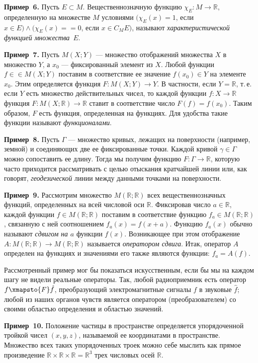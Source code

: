 \textbf{Пример~6.} Пусть $E \subset M$. Вещественнозначную функцию $\chi_E \colon M \to \mathbb{R}$,
определенную на множестве $M$ условиями $(\chi_E(x) = 1$, если $x \in E) \land (\chi_E(x) =
{} = 0$, если $x \in C_M E)$, называют \textit{характеристической функцией множества}~$E$.

\textbf{Пример~7.} Пусть $M(X; Y)$ --- множество отображений множества $X$ в
множество $Y$, а $x_0$ --- фиксированный элемент из $X$. Любой функции $f \in
{} \in M(X; Y)$ поставим в соответствие ее значение $f(x_0) \in Y$ на элементе $x_0$.
Этим определяется функция $F \colon M(X; Y) \to Y$. В частности, если $Y = \mathbb{R}$, т.\,е.
если $Y$ есть множество действительных чисел, то каждой функции $f \colon X \to \mathbb{R}$
функция $F \colon M(X; \mathbb{R}) \to \mathbb{R}$ ставит в соответствие число $F(f) = f(x_0)$. Таким
образом, $F$ есть функция, определенная на функциях. Для удобства такие
функции называют \textit{функционалами}.

\textbf{Пример~8.} Пусть $\Gamma$ --- множество кривых, лежащих на поверхности (например, земной) и соединяющих две ее фиксированные точки. Каждой кривой $\gamma \in \Gamma$ можно сопоставить ее длину. Тогда мы получим функцию $F \colon \Gamma \to \mathbb{R}$,
которую часто приходится рассматривать с целью отыскания кратчайшей
линии или, как говорят, \textit{геодезической} линии между данными точками на
поверхности.

\textbf{Пример~9.} Рассмотрим множество $M(\mathbb{R}; \mathbb{R})$ всех вещественнозначных
функций, определенных на всей числовой оси $\mathbb{R}$. Фиксировав число $a \in \mathbb{R}$,
каждой функции $f \in M(\mathbb{R}; \mathbb{R})$ поставим в соответствие функцию $f_a \in M(\mathbb{R}; \mathbb{R})$,
связанную с ней соотношением $f_a(x) = f(x + a)$. Функцию $f_a(x)$ обычно
называют \textit{сдвигом на $a$} функции $f(x)$. Возникающее при этом отображение
$A \colon M(\mathbb{R}; \mathbb{R}) \to M(\mathbb{R}; \mathbb{R})$ называется \textit{оператором сдвига}. Итак, оператор $A$
определен на функциях и значениями его также являются функции: $f_a = A(f)$.

Рассмотренный пример мог бы показаться искусственным, если бы мы
на каждом шагу не видели реальные операторы. Так, любой радиоприемник есть оператор $f \xmapsto{F} \hat{f}$, преобразующий электромагнитные сигналы $f$ в
звуковые $\hat{f}$; любой из наших органов чувств является оператором (преобразователем) со своими областью определения и областью значений.

\textbf{Пример~10.} Положение частицы в пространстве определяется упорядоченной тройкой чисел $(x, y, z)$, называемой ее координатами в пространстве. Множество всех таких упорядоченных троек можно себе мыслить как
прямое произведение $\mathbb{R} \times \mathbb{R} \times \mathbb{R} = \mathbb{R}^3$ трех числовых осей $\mathbb{R}$.


